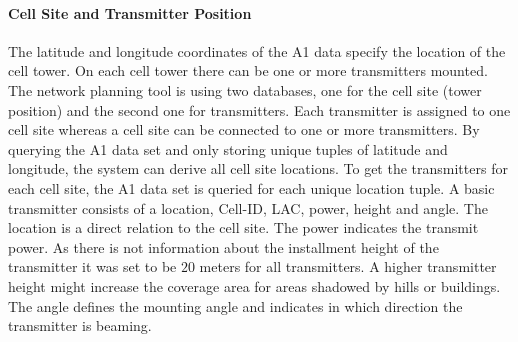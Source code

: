 \documentclass[master,english]{hgbthesis}
\begin{document}
\paragraph{Cell Site and Transmitter Position}
The latitude and longitude coordinates of the A1 data specify the location of the cell tower. On each cell tower there can be one or more transmitters mounted. The network planning tool is using two databases, one for the cell site (tower position) and the second one for transmitters. Each transmitter is assigned to one cell site whereas a cell site can be connected to one or more transmitters.
By querying the A1 data set and only storing unique tuples of latitude and longitude, the system can derive all cell site locations. To get the transmitters for each cell site, the A1 data set is queried for each unique location tuple. A basic transmitter consists of a location, Cell-ID, LAC, power, height and angle. The location is a direct relation to the cell site. The power indicates the transmit power. As there is not information about the installment height of the transmitter it was set to be $20$ meters for all transmitters. A higher transmitter height might increase the coverage area for areas shadowed by hills or buildings. The angle defines the mounting angle and indicates in which direction the transmitter is beaming.
\end{document}
